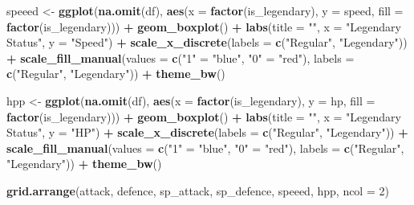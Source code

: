 \documentclass[
]{article}
\newenvironment{Shaded}{\begin{snugshade}}{\end{snugshade}}
\newcommand{\AttributeTok}[1]{\textcolor[rgb]{0.13,0.29,0.53}{#1}}
\newcommand{\DecValTok}[1]{\textcolor[rgb]{0.00,0.00,0.81}{#1}}
\newcommand{\FunctionTok}[1]{\textcolor[rgb]{0.13,0.29,0.53}{\textbf{#1}}}
\newcommand{\NormalTok}[1]{#1}
\newcommand{\OtherTok}[1]{\textcolor[rgb]{0.56,0.35,0.01}{#1}}
\newcommand{\SpecialCharTok}[1]{\textcolor[rgb]{0.81,0.36,0.00}{\textbf{#1}}}
\newcommand{\StringTok}[1]{\textcolor[rgb]{0.31,0.60,0.02}{#1}}
\begin{document}
\begin{Shaded}
\begin{Highlighting}[]
\NormalTok{speeed }\OtherTok{\textless{}{-}} \FunctionTok{ggplot}\NormalTok{(}\FunctionTok{na.omit}\NormalTok{(df), }\FunctionTok{aes}\NormalTok{(}\AttributeTok{x =} \FunctionTok{factor}\NormalTok{(is\_legendary), }\AttributeTok{y =}\NormalTok{ speed, }\AttributeTok{fill =} \FunctionTok{factor}\NormalTok{(is\_legendary))) }\SpecialCharTok{+}
  \FunctionTok{geom\_boxplot}\NormalTok{() }\SpecialCharTok{+}
  \FunctionTok{labs}\NormalTok{(}\AttributeTok{title =} \StringTok{""}\NormalTok{, }\AttributeTok{x =} \StringTok{"Legendary Status"}\NormalTok{, }\AttributeTok{y =} \StringTok{"Speed"}\NormalTok{) }\SpecialCharTok{+}
  \FunctionTok{scale\_x\_discrete}\NormalTok{(}\AttributeTok{labels =} \FunctionTok{c}\NormalTok{(}\StringTok{"Regular"}\NormalTok{, }\StringTok{"Legendary"}\NormalTok{)) }\SpecialCharTok{+}
  \FunctionTok{scale\_fill\_manual}\NormalTok{(}\AttributeTok{values =} \FunctionTok{c}\NormalTok{(}\StringTok{"1"} \OtherTok{=} \StringTok{"blue"}\NormalTok{, }\StringTok{"0"} \OtherTok{=} \StringTok{"red"}\NormalTok{), }\AttributeTok{labels =} \FunctionTok{c}\NormalTok{(}\StringTok{"Regular"}\NormalTok{, }\StringTok{"Legendary"}\NormalTok{)) }\SpecialCharTok{+}
  \FunctionTok{theme\_bw}\NormalTok{()}

\NormalTok{hpp }\OtherTok{\textless{}{-}} \FunctionTok{ggplot}\NormalTok{(}\FunctionTok{na.omit}\NormalTok{(df), }\FunctionTok{aes}\NormalTok{(}\AttributeTok{x =} \FunctionTok{factor}\NormalTok{(is\_legendary), }\AttributeTok{y =}\NormalTok{ hp, }\AttributeTok{fill =} \FunctionTok{factor}\NormalTok{(is\_legendary))) }\SpecialCharTok{+}
  \FunctionTok{geom\_boxplot}\NormalTok{() }\SpecialCharTok{+}
  \FunctionTok{labs}\NormalTok{(}\AttributeTok{title =} \StringTok{""}\NormalTok{, }\AttributeTok{x =} \StringTok{"Legendary Status"}\NormalTok{, }\AttributeTok{y =} \StringTok{"HP"}\NormalTok{) }\SpecialCharTok{+}
  \FunctionTok{scale\_x\_discrete}\NormalTok{(}\AttributeTok{labels =} \FunctionTok{c}\NormalTok{(}\StringTok{"Regular"}\NormalTok{, }\StringTok{"Legendary"}\NormalTok{)) }\SpecialCharTok{+}
  \FunctionTok{scale\_fill\_manual}\NormalTok{(}\AttributeTok{values =} \FunctionTok{c}\NormalTok{(}\StringTok{"1"} \OtherTok{=} \StringTok{"blue"}\NormalTok{, }\StringTok{"0"} \OtherTok{=} \StringTok{"red"}\NormalTok{), }\AttributeTok{labels =} \FunctionTok{c}\NormalTok{(}\StringTok{"Regular"}\NormalTok{, }\StringTok{"Legendary"}\NormalTok{)) }\SpecialCharTok{+}
  \FunctionTok{theme\_bw}\NormalTok{()}

\FunctionTok{grid.arrange}\NormalTok{(attack, defence, sp\_attack, sp\_defence, speeed, hpp, }\AttributeTok{ncol =} \DecValTok{2}\NormalTok{)}
\end{Highlighting}
\end{Shaded}
\end{document}
